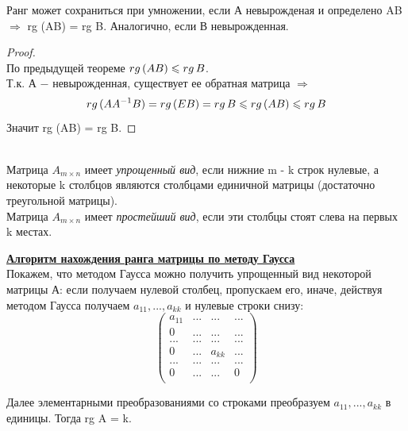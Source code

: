 \begin{proposition}
    Ранг может сохраниться при умножении, если А невырожденая и определено AB $\Longrightarrow$ rg (AB) = rg B. Аналогично, если В невырожденная.
\end{proposition}
\begin{proof}
    \tab\\

    По предыдущей теореме $rg\thinspace (AB) \leq rg\thinspace B$.\\

    Т.к. А $-$ невырожденная, существует ее обратная матрица $\Longrightarrow$
    \[
    rg\thinspace (AA^{-1}B) = rg\thinspace (EB) = rg\thinspace B \leq rg\thinspace (AB) \leq rg\thinspace B
    \]
    Значит rg (AB) = rg B.
\end{proof}

\begin{definition}
\tab\\
    Матрица $A_{m\times n}$ имеет \textit{упрощенный вид}, если нижние m - k строк нулевые, а некоторые k столбцов являются столбцами единичной матрицы (достаточно треугольной матрицы).\\

    Матрица $A_{m\times n}$ имеет \textit{простейший вид}, если эти столбцы стоят слева на первых k местах.\\
\end{definition}

\textbf{\underline{Алгоритм нахождения ранга матрицы по методу Гаусса}}\\

Покажем, что методом Гаусса можно получить упрощенный вид некоторой матрицы А: если получаем нулевой столбец, пропускаем его, иначе, действуя методом Гаусса получаем $a_{11}, ..., a_{kk}$ и нулевые строки снизу:
\[
\begin{pmatrix}
    a_{11} & ... & ... & ... \\
    0 & ... & ... & ... \\
    ... & ... & ... & ... \\
    0 & ... & a_{kk} & ... \\
    ... & ... & ... & ... \\
    0 & ... & ... & 0 \\
\end{pmatrix}
\]

Далее элементарными преобразованиями со строками преобразуем $a_{11}, ..., a_{kk}$ в единицы. Тогда rg A = k.\\

